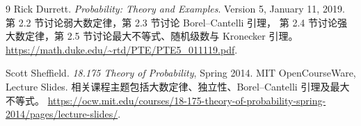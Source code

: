\documentclass[UTF8,12pt,a4paper,fontset=fandol]{ctexart}
\begin{document}
\begin{thebibliography}{9}
Rick Durrett.
\textit{Probability: Theory and Examples}.
Version 5, January 11, 2019.
第 2.2 节讨论弱大数定律，第 2.3 节讨论 Borel--Cantelli 引理，
第 2.4 节讨论强大数定律，第 2.5 节讨论最大不等式、随机级数与 Kronecker 引理。
\url{https://math.duke.edu/~rtd/PTE/PTE5_011119.pdf}.

Scott Sheffield.
\textit{18.175 Theory of Probability}, Spring 2014.
MIT OpenCourseWare, Lecture Slides.
相关课程主题包括大数定律、独立性、Borel--Cantelli 引理及最大不等式。
\url{https://ocw.mit.edu/courses/18-175-theory-of-probability-spring-2014/pages/lecture-slides/}.
\end{thebibliography}
\end{document}
